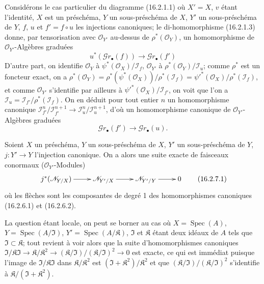\begin{env}[16.2.6]
\label{IV.16.2.6}
Considérons le cas particulier du diagramme (16.2.1.1) où $X'=X$, $v$ étant
l'identité, $X$ est un préschéma, $Y$ un sous-préschéma de $X$, $Y'$ un
sous-préschéma de $Y$, $f$, $u$ et $f'=f\circ u$ les injections canoniques; le
di-homomorphisme (16.2.1.3) donne, par tensorisation avec
$\mathcal{O}_{Y'}$ au-dessus de $\rho^*(\mathcal{O}_Y)$, un homomorphisme de
$\mathcal{O}_{Y'}$-Algèbres graduées
\[
  u^*(\mathscr{G}r_\bullet(f))
  \longrightarrow\mathscr{G}r_\bullet(f')
  \tag{16.2.6.1}
  \label{IV.16.2.6.1}
\]
D'autre part, on identifie $\mathcal{O}_Y$ à
$\psi^*(\mathcal{O}_X)/\mathscr{I}_f$, $\mathcal{O}_{Y'}$ à
$\rho^*(\mathcal{O}_Y)/\mathscr{I}_u$; comme $\rho^*$ est un foncteur exact,
on a
$\rho^*(\mathcal{O}_Y)=
\rho^*(\psi^*(\mathcal{O}_X))/\rho^*(\mathscr{I}_f)=
\psi'^*(\mathcal{O}_X)/\rho^*(\mathscr{I}_f)$, et comme
$\mathcal{O}_{Y'}$ s'identifie par ailleurs à
$\psi'^*(\mathcal{O}_X)/\mathscr{I}_{f'}$, on voit que l'on a
$\mathscr{I}_u=\mathscr{I}_{f'}/\rho^*(\mathscr{I}_f)$. On en déduit pour
tout entier $n$ un homomorphisme canonique
$\mathscr{I}_{f'}^n/\mathscr{I}_{f'}^{n+1}\to
\mathscr{I}_u^n/\mathscr{I}_u^{n+1}$, d'où un homomorphisme canonique de
$\mathcal{O}_{Y'}$-Algèbres graduées
\[
  \mathscr{G}r_\bullet(f')
  \longrightarrow\mathscr{G}r_\bullet(u).
  \tag{16.2.6.2}
  \label{IV.16.2.6.2}
\]
\end{env}

\begin{proposition}[16.2.7]
\label{IV.16.2.7}
Soient $X$ un préschéma, $Y$ un sous-préschéma de $X$, $Y'$ un
sous-préschéma de $Y$, $j:Y'\to Y$ l'injection canonique. On a alors une suite
exacte de faisceaux conormaux ($\mathcal{O}_{Y'}$-Modules)
\[
  \xymatrix{
    j^*(\mathscr{N}_{Y/X}) \ar[r] &
    \mathscr{N}_{Y'/X} \ar[r] &
    \mathscr{N}_{Y'/Y} \ar[r] & 0
  }
  \tag{16.2.7.1}
  \label{IV.16.2.7.1}
\]
où les flèches sont les composantes de degré 1 des homomorphismes canoniques
(16.2.6.1) et (16.2.6.2).
\end{proposition}

La question étant locale, on peut se borner au cas où
$X=\operatorname{Spec}(A)$, $Y=\operatorname{Spec}(A/\mathfrak{I})$,
$Y'=\operatorname{Spec}(A/\mathfrak{K})$, $\mathfrak{I}$ et $\mathfrak{K}$
étant deux idéaux de $A$ tels que $\mathfrak{I}\subset\mathfrak{K}$; tout
revient à voir alors
que la suite d'homomorphismes canoniques
$\mathfrak{I}/\mathfrak{K}\mathfrak{I}\to
\mathfrak{K}/\mathfrak{K}^2\to
(\mathfrak{K}/\mathfrak{I})/(\mathfrak{K}/\mathfrak{I})^2\to 0$
est exacte, ce qui est immédiat puisque l'image de
$\mathfrak{I}/\mathfrak{K}\mathfrak{I}$ dans
$\mathfrak{K}/\mathfrak{K}^2$ est
$(\mathfrak{I}+\mathfrak{K}^2)/\mathfrak{K}^2$ et que
$(\mathfrak{K}/\mathfrak{I})/(\mathfrak{K}/\mathfrak{I})^2$ s'identifie à
$\mathfrak{K}/(\mathfrak{I}+\mathfrak{K}^2)$.

